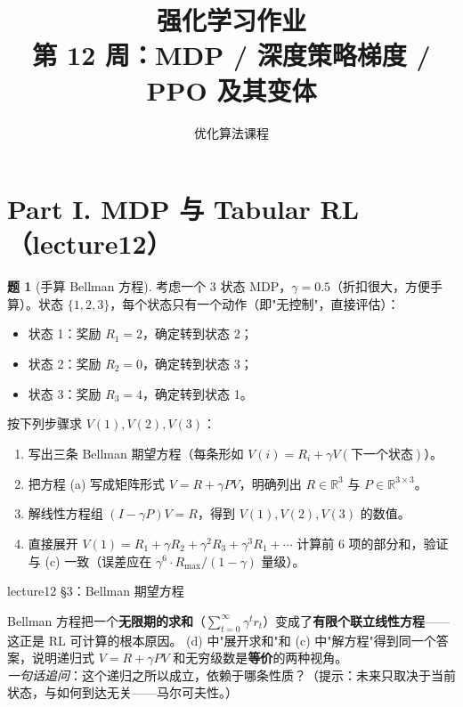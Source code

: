 \documentclass[11pt,a4paper]{article}
\title{\textbf{强化学习作业}\\[0.4em]
\large 第 12 周：MDP / 深度策略梯度 / PPO 及其变体}
\author{优化算法课程}
\date{}
\theoremstyle{definition}
\newtheorem{problem}{题}
\begin{document}
\maketitle

\begin{center}
\end{center}

\bigskip

\section*{Part I. MDP 与 Tabular RL（lecture12）}

\begin{problem}[手算 Bellman 方程]
考虑一个 3 状态 MDP，$\gamma = 0.5$（折扣很大，方便手算）。状态 $\{1, 2, 3\}$，每个状态只有一个动作（即"无控制"，直接评估）：
\begin{itemize}
    \item 状态 1：奖励 $R_1 = 2$，确定转到状态 2；
    \item 状态 2：奖励 $R_2 = 0$，确定转到状态 3；
    \item 状态 3：奖励 $R_3 = 4$，确定转到状态 1。
\end{itemize}
按下列步骤求 $V(1), V(2), V(3)$：
\begin{enumerate}[label=(\alph*)]
    \item 写出三条 Bellman 期望方程（每条形如 $V(i) = R_i + \gamma V(\text{下一个状态})$）。
    \item 把方程 (a) 写成矩阵形式 $V = R + \gamma P V$，明确列出 $R \in \mathbb{R}^3$ 与 $P \in \mathbb{R}^{3\times 3}$。
    \item 解线性方程组 $(I - \gamma P)V = R$，得到 $V(1), V(2), V(3)$ 的数值。
    \item 直接展开 $V(1) = R_1 + \gamma R_2 + \gamma^2 R_3 + \gamma^3 R_1 + \cdots$ 计算前 6 项的部分和，验证与 (c) 一致（误差应在 $\gamma^6 \cdot R_{\max}/(1-\gamma)$ 量级）。
\end{enumerate}
\begin{topicbox}
lecture12 §3：Bellman 期望方程
\end{topicbox}
\begin{takeaway}
Bellman 方程把一个\textbf{无限期的求和}（$\sum_{t=0}^\infty \gamma^t r_t$）变成了\textbf{有限个联立线性方程}——这正是 RL 可计算的根本原因。
(d) 中"展开求和"和 (c) 中"解方程"得到同一个答案，说明递归式 $V = R + \gamma PV$ 和无穷级数是\textbf{等价}的两种视角。\\
\textit{一句话追问}：这个递归之所以成立，依赖于哪条性质？（提示：未来只取决于当前状态，与如何到达无关——马尔可夫性。）
\end{takeaway}
\end{problem}
\end{document}
